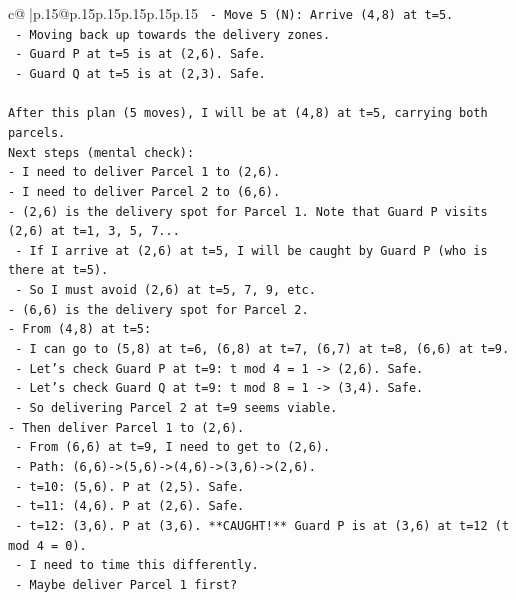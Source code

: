 \documentclass{article}
\begin{document}
{\begin{supertabular}{c@{$\;$}|p{.15\linewidth}@{}p{.15\linewidth}p{.15\linewidth}p{.15\linewidth}p{.15\linewidth}p{.15\linewidth}}
{{{\texttt{  {-} Move 5 (N): Arrive (4,8) at t=5.} \\
\texttt{    {-} Moving back up towards the delivery zones.} \\
\texttt{    {-} Guard P at t=5 is at (2,6). Safe.} \\
\texttt{    {-} Guard Q at t=5 is at (2,3). Safe.} \\
\\ 
\texttt{After this plan (5 moves), I will be at (4,8) at t=5, carrying both parcels.} \\
\texttt{Next steps (mental check):} \\
\texttt{{-} I need to deliver Parcel 1 to (2,6).} \\
\texttt{{-} I need to deliver Parcel 2 to (6,6).} \\
\texttt{{-} (2,6) is the delivery spot for Parcel 1. Note that Guard P visits (2,6) at t=1, 3, 5, 7...} \\
\texttt{  {-} If I arrive at (2,6) at t=5, I will be caught by Guard P (who is there at t=5).} \\
\texttt{  {-} So I must avoid (2,6) at t=5, 7, 9, etc.} \\
\texttt{{-} (6,6) is the delivery spot for Parcel 2.} \\
\texttt{{-} From (4,8) at t=5:} \\
\texttt{  {-} I can go to (5,8) at t=6, (6,8) at t=7, (6,7) at t=8, (6,6) at t=9.} \\
\texttt{  {-} Let's check Guard P at t=9: t mod 4 = 1 {-}> (2,6). Safe.} \\
\texttt{  {-} Let's check Guard Q at t=9: t mod 8 = 1 {-}> (3,4). Safe.} \\
\texttt{  {-} So delivering Parcel 2 at t=9 seems viable.} \\
\texttt{{-} Then deliver Parcel 1 to (2,6).} \\
\texttt{  {-} From (6,6) at t=9, I need to get to (2,6).} \\
\texttt{  {-} Path: (6,6){-}>(5,6){-}>(4,6){-}>(3,6){-}>(2,6).} \\
\texttt{  {-} t=10: (5,6). P at (2,5). Safe.} \\
\texttt{  {-} t=11: (4,6). P at (2,6). Safe.} \\
\texttt{  {-} t=12: (3,6). P at (3,6). **CAUGHT!** Guard P is at (3,6) at t=12 (t mod 4 = 0).} \\
\texttt{  {-} I need to time this differently.} \\
\texttt{  {-} Maybe deliver Parcel 1 first?} \\
}}}
\end{supertabular}}
\end{document}
